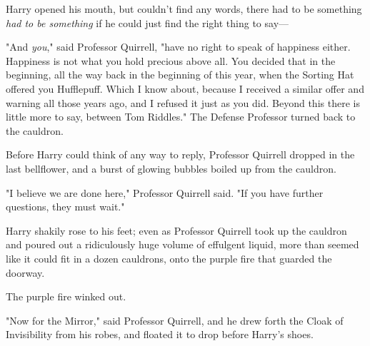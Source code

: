 Harry opened his mouth, but couldn't find any words, there had to be something
\emph{had to be something} if he could just find the right thing to say---

"And \emph{you}," said Professor Quirrell, "have no right to speak of happiness
either. Happiness is not what you hold precious above all. You decided that in
the beginning, all the way back in the beginning of this year, when the Sorting
Hat offered you Hufflepuff. Which I know about, because I received a similar
offer and warning all those years ago, and I refused it just as you did. Beyond
this there is little more to say, between Tom Riddles." The Defense Professor
turned back to the cauldron.

Before Harry could think of any way to reply, Professor Quirrell dropped in the
last bellflower, and a burst of glowing bubbles boiled up from the cauldron.

"I believe we are done here," Professor Quirrell said. "If you have further
questions, they must wait."

Harry shakily rose to his feet; even as Professor Quirrell took up the cauldron
and poured out a ridiculously huge volume of effulgent liquid, more than seemed
like it could fit in a dozen cauldrons, onto the purple fire that guarded the
doorway.

The purple fire winked out.

"Now for the Mirror," said Professor Quirrell, and he drew forth the Cloak of
Invisibility from his robes, and floated it to drop before Harry's shoes.

